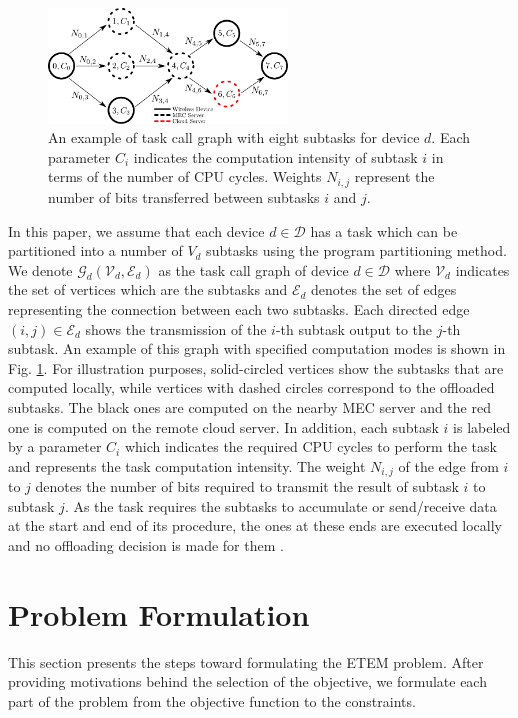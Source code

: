 \documentclass[12pt,draftclsnofoot,onecolumn]{IEEEtran}
\begin{document}
\begin{figure}
	\centering
	\includegraphics[width=180pt]{task_call_graph.pdf}
	\caption{An example of task call graph with eight subtasks for device $d$. Each parameter $C_{i}$ indicates the computation intensity of subtask $i$ in terms of the number of CPU cycles. Weights $N_{i,j}$ represent the number of bits transferred between subtasks $i$ and $j$.}\label{fig3}
\end{figure}

In this paper, we assume that each device $d\in\mathcal{D}$ has a task which can be partitioned into a number of $V_d$ subtasks using the program partitioning method. We denote $\mathcal{G}_d(\mathcal{V}_d,\mathcal{E}_d)$ as the task call graph of device $d\in\mathcal{D}$ where $\mathcal{V}_d$ indicates the set of vertices which are the subtasks and $\mathcal{E}_d$ denotes the set of edges representing the connection between each two subtasks. Each directed edge $(i,j)\in\mathcal{E}_d$ shows the transmission of the $i$-th subtask output to the $j$-th subtask. An example of this graph with specified computation modes is shown in Fig. \ref{fig3}. For illustration purposes, solid-circled vertices show the subtasks that are computed locally, while vertices with dashed circles correspond to the offloaded subtasks. The black ones are computed on the nearby MEC server and the red one is computed on the remote cloud server. In addition, each subtask $i$ is labeled by a parameter $C_{i}$ which indicates the required CPU cycles to perform the task and represents the task computation intensity. The weight $N_{i,j}$ of the edge from $i$ to $j$ denotes the number of bits required to transmit the result of subtask $i$ to subtask $j$. As the task requires the subtasks to accumulate or send/receive data at the start and end of its procedure, the ones at these ends are executed locally and no offloading decision is made for them \cite{b4}.

\section{Problem Formulation}
This section presents the steps toward formulating the ETEM problem. After providing motivations behind the selection of the objective, we formulate each part of the problem from the objective function to the constraints.
\end{document}
